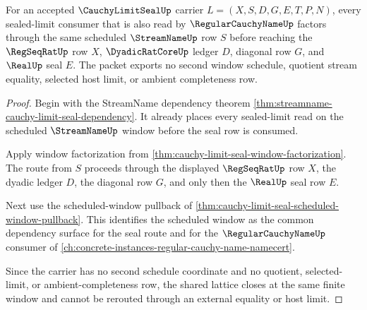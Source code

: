 \begin{theorem}
\label{thm:cauchy-limit-seal-streamname-regular-name-lattice}
For an accepted $\CauchyLimitSealUp$ carrier $L=(X,S,D,G,E,T,P,N)$, every sealed-limit consumer that is also read by $\RegularCauchyNameUp$ factors through the same scheduled $\StreamNameUp$ row $S$ before reaching the $\RegSeqRatUp$ row $X$, $\DyadicRatCoreUp$ ledger $D$, diagonal row $G$, and $\RealUp$ seal $E$. The packet exports no second window schedule, quotient stream equality, selected host limit, or ambient completeness row.
\end{theorem}
\begin{proof}
Begin with the StreamName dependency theorem \autoref{thm:streamname-cauchy-limit-seal-dependency}. It already places every sealed-limit read on the scheduled $\StreamNameUp$ window before the seal row is consumed.

Apply window factorization from \autoref{thm:cauchy-limit-seal-window-factorization}. The route from $S$ proceeds through the displayed $\RegSeqRatUp$ row $X$, the dyadic ledger $D$, the diagonal row $G$, and only then the $\RealUp$ seal row $E$.

Next use the scheduled-window pullback of \autoref{thm:cauchy-limit-seal-scheduled-window-pullback}. This identifies the scheduled window as the common dependency surface for the seal route and for the $\RegularCauchyNameUp$ consumer of \autoref{ch:concrete-instances-regular-cauchy-name-namecert}.

Since the carrier has no second schedule coordinate and no quotient, selected-limit, or ambient-completeness row, the shared lattice closes at the same finite window and cannot be rerouted through an external equality or host limit.
\end{proof}

